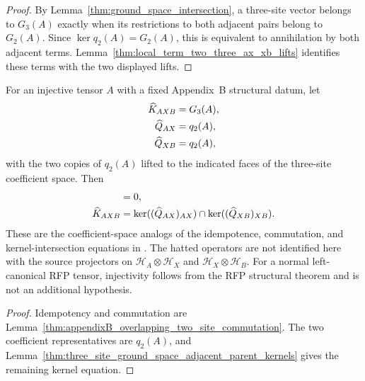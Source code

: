 \begin{proof}
    \leanok
    By Lemma~\ref{thm:ground_space_intersection}, a three-site vector belongs
    to $G_3(A)$ exactly when its restrictions to both adjacent pairs belong to
    $G_2(A)$. Since $\ker q_2(A)=G_2(A)$, this is equivalent to annihilation
    by both adjacent terms. Lemma~\ref{thm:local_term_two_three_ax_xb_lifts}
    identifies these terms with the two displayed lifts.
\end{proof}

\begin{lemma}
    \label{thm:appendixB_definition_d2_coefficient_analogue}
    \leanok
    For an injective tensor $A$ with a fixed Appendix~B structural datum, let
    \begin{align}
        \widehat K_{AXB}
         & =G_3(A),
        \notag      \\
        \widehat Q_{AX}
         & =q_2(A),
        \notag      \\
        \widehat Q_{XB}
         & =q_2(A),
        \notag
    \end{align}
    with the two copies of $q_2(A)$ lifted to the indicated faces of the
    three-site coefficient space. Then
    \begin{align}
        [(\widehat Q_{AX})_{AX},(\widehat Q_{XB})_{XB}]
         & =0,
        \notag \\
        \widehat K_{AXB}
         & =
        \ker((\widehat Q_{AX})_{AX})
        \cap\ker((\widehat Q_{XB})_{XB}).
        \notag
    \end{align}
    These are the coefficient-space analogs of the idempotence, commutation,
    and kernel-intersection equations in
    \cite[Definition~D.2]{Cirac2016MPDO_arXiv}. The hatted operators are not
    identified here with the source projectors on
    $\mathcal H_A\otimes\mathcal H_X$ and
    $\mathcal H_X\otimes\mathcal H_B$. For a normal left-canonical RFP tensor,
    injectivity follows from the RFP structural theorem and is not an
    additional hypothesis.
\end{lemma}

\begin{proof}
    \leanok
    Idempotency and commutation are
    Lemma~\ref{thm:appendixB_overlapping_two_site_commutation}. The two
    coefficient representatives are $q_2(A)$, and
    Lemma~\ref{thm:three_site_ground_space_adjacent_parent_kernels} gives
    the remaining kernel equation.
\end{proof}

